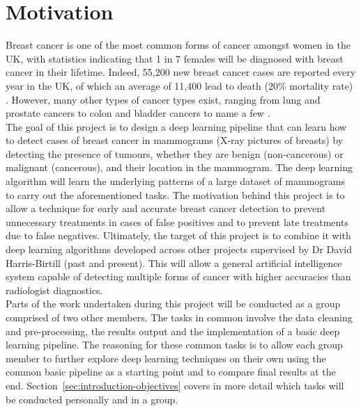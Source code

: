 \section{Motivation}

Breast cancer is one of the most common forms of cancer amongst women in the UK, with statistics indicating that 1 in 7 females will be diagnosed with breast cancer in their lifetime. Indeed, 55,200 new breast cancer cases are reported every year in the UK, of which an average of 11,400 lead to death (20\% mortality rate) \citep{BreastCancerResearchUK}. However, many other types of cancer types exist, ranging from lung and prostate cancers to colon and bladder cancers to name a few \citep{cokkinides2005american}.\\

The goal of this project is to design a deep learning pipeline that can learn how to detect cases of breast cancer in mammograms (X-ray pictures of breasts) by detecting the presence of tumours, whether they are benign (non-cancerous) or malignant (cancerous), and their location in the mammogram. The deep learning algorithm will learn the underlying patterns of a large dataset of mammograms to carry out the aforementioned tasks. The motivation behind this project is to allow a technique for early and accurate breast cancer detection to prevent unnecessary treatments in cases of false positives and to prevent late treatments due to false negatives. Ultimately, the target of this project is to combine it with deep learning algorithms developed across other projects supervised by Dr David Harris-Birtill (past and present). This will allow a general artificial intelligence system capable of detecting multiple forms of cancer with higher accuracies than radiologist diagnostics.\\

Parts of the work undertaken during this project will be conducted as a group comprised of two other members. The tasks in common involve the data cleaning and pre-processing, the results output and the implementation of a basic deep learning pipeline. The reasoning for these common tasks is to allow each group member to further explore deep learning techniques on their own using the common basic pipeline as a starting point and to compare final results at the end. Section~\ref{sec:introduction-objectives} covers in more detail which tasks will be conducted personally and in a group.


